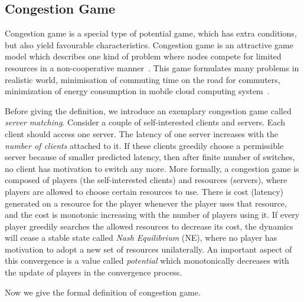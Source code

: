 \subsection{Congestion Game}
Congestion game is a special type of potential game, which has extra conditions, but also yield favourable characteristics.
Congestion game is an attractive game model which describes one kind of problem where nodes compete for limited resources in a non-cooperative manner~\cite{Voecking06congestiongames}.
This game formulates many problems in realistic world, \eg minimisation of commuting time on the road for commuters, minimization of energy consumption in mobile cloud computing system~\cite{game_cloudcomputing_energy12}.

Before giving the definition, we introduce an exemplary congestion game called \textit{server matching}.
Consider a couple of self-interested clients and servers.
Each client should access one server.
The latency of one server increases with the \textit{number of clients} attached to it.
If these clients greedily choose a permissible server because of smaller predicted latency, then after finite number of switches, no client has motivation to switch any more.
%
More formally, a congestion game is composed of players (the self-interested clients) and resources (servers), where players are allowed to choose certain resources to use. There is cost (latency) generated on a resource for the player whenever the player uses that resource, and the cost is monotonic increasing with the number of players using it. 
If every player greedily searches the allowed resources to decrease its cost, the dynamics will cease a stable state called \emph{Nash Equilibrium} (NE), where no player has motivation to adopt a new set of resources unilaterally. 
An important aspect of this convergence is a value called \textit{potential} which monotonically decreases with the update of players in the convergence process.

Now we give the formal definition of congestion game.


